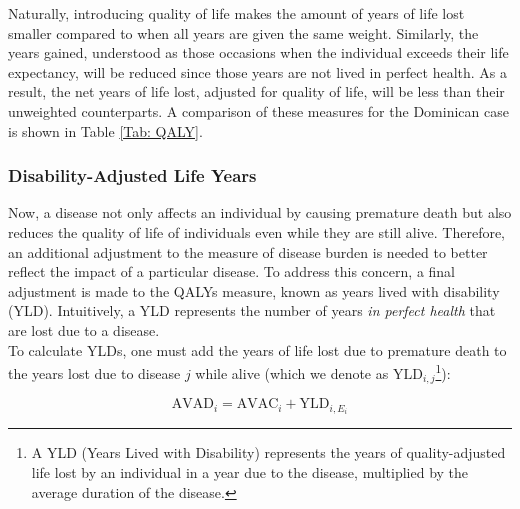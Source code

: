 \documentclass[11pt]{article}
\numberwithin{equation}{section}
\theoremstyle{remark}
\begin{document}
Naturally, introducing quality of life makes the amount of years of life lost smaller compared to when all years are given the same weight. Similarly, the years gained, understood as those occasions when the individual exceeds their life expectancy, will be reduced since those years are not lived in perfect health. As a result, the net years of life lost, adjusted for quality of life, will be less than their unweighted counterparts. A comparison of these measures for the Dominican case is shown in Table \ref{Tab: QALY}.
\begin{table}[H]
    \caption{\label{Tab: QALY} YLL \textit{vs}. YLL adjusted by quality of life, 2016-2019}
    \centering
\end{table}

\subsubsection{Disability-Adjusted Life Years}

Now, a disease not only affects an individual by causing premature death but also reduces the quality of life of individuals even while they are still alive. Therefore, an additional adjustment to the measure of disease burden is needed to better reflect the impact of a particular disease. To address this concern, a final adjustment is made to the QALYs measure, known as years lived with disability (YLD). Intuitively, a YLD represents the number of years \emph{in perfect health} that are lost due to a disease. \\

To calculate YLDs, one must add the years of life lost due to premature death to the years lost due to disease $j$ while alive (which we denote as $\text{YLD}_{i,j}$\footnote{A YLD (Years Lived with Disability) represents the years of quality-adjusted life lost by an individual in a year due to the disease, multiplied by the average duration of the disease.}):

\[\text{AVAD}_i=\text{AVAC}_i+\text{YLD}_{i,E_i}\]
\end{document}
